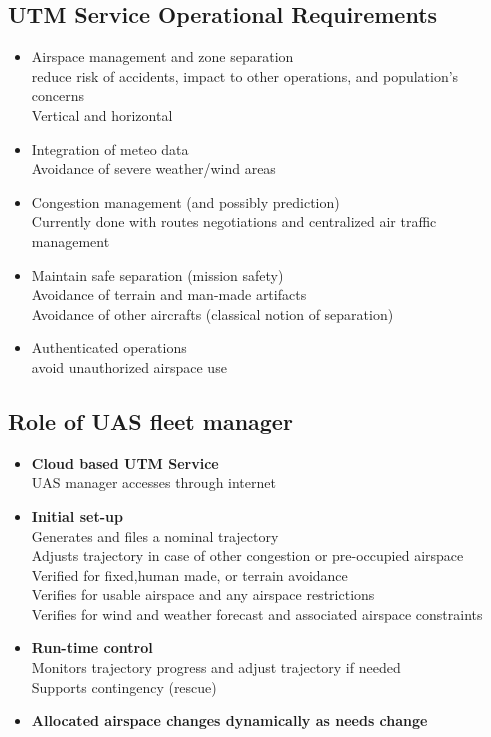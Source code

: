 \documentclass[10pt,a4paper]{book}
\begin{document}
\subsection{UTM Service Operational Requirements}
\begin{itemize}
\item Airspace management and zone separation\\
reduce risk of accidents, impact to other operations, and population’s
concerns\\
Vertical and horizontal
\item Integration of meteo data\\
Avoidance of severe weather/wind areas
\item Congestion management (and possibly prediction)\\
Currently done with routes negotiations and centralized air traffic management
\item Maintain safe separation (mission safety)\\
Avoidance of terrain and man-made artifacts\\
Avoidance of other aircrafts (classical notion of separation)
\item Authenticated operations\\
avoid unauthorized airspace use
\end{itemize}
\subsection{Role of UAS fleet manager}
\begin{itemize}
\item \textbf{Cloud based UTM Service}\\
UAS manager accesses through internet\\
\item \textbf{Initial set-up}\\
Generates and files a nominal trajectory\\
Adjusts trajectory in case of other congestion or pre-occupied airspace\\
Verified for fixed,human made, or terrain avoidance\\
Verifies for usable airspace and any airspace restrictions\\
Verifies for wind and weather forecast and associated airspace constraints
\item \textbf{Run-time control}\\
Monitors trajectory progress and adjust trajectory if needed\\
Supports contingency (rescue)
\item \textbf{Allocated airspace changes dynamically as needs change}
\end{itemize}
\end{document}
